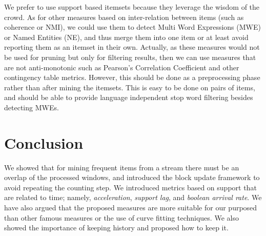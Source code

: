 \documentclass[11pt]{llncs} %
\begin{document}
We prefer to use support based itemsets because they leverage the wisdom of the crowd. As for other measures based on inter-relation between items (such as coherence or NMI), we could use them to detect Multi Word Expressions (MWE) or Named Entities (NE), and thus merge them into one item or at least avoid reporting them as an itemset in their own. Actually, as these measures would not be used for pruning but only for filtering results, then we can use measures that are not anti-monotonic such as Pearson's Correlation Coefficient and other contingency table metrics. However, this should be done as a preprocessing phase rather than after mining the itemsets. This is easy to be done on pairs of items, and should be able to provide language independent stop word filtering besides detecting MWEs.

\section{Conclusion}
We showed that for mining frequent items from a stream there must be an overlap of the processed windows, and introduced the block update framework to avoid repeating the counting step. We introduced metrics based on support that are related to time; namely, \emph{acceleration}, \emph{support lag}, and \emph{boolean arrival rate}. We have also argued that the proposed measures are more suitable for our purposed than other famous measures or the use of curve fitting techniques. We also showed the importance of keeping history and proposed how to keep it.
\end{document}
